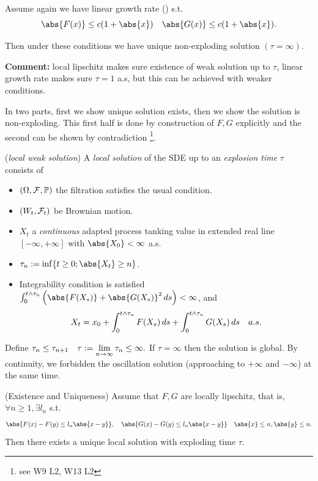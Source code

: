 Assume again we have linear growth rate () s.t.
\begin{equation*}
    \abs{F(x)} \leq c(1 + \abs{x}) \quad \abs{G(x)} \leq c(1 + \abs{x}).
\end{equation*}

Then under these conditions we have unique non-exploding solution $(\tau = \infty)$.

\textbf{Comment:} local lipschitz makes sure existence of weak solution up to $\tau$, linear growth rate makes sure $\tau = 1$ a.s, but this can be achieved with weaker conditions.

\pf In two parts, first we show unique solution exists, then we show the solution is non-exploding. This first half is done by construction of $F, G$ explicitly and the second can be shown by contradiction \footnote{see W9 L2, W13 L2}.

\begin{dfn}{(\textit{local weak solution})}
A \textit{local solution} of the SDE up to an \textit{explosion time} $\tau$ consists of
\begin{itemize}
    \item $(\Omega, \mathcal{F}, \mathbb{P})$ the filtration satisfies the usual condition.
    \item $(W_t, \mathcal{F}_t)$ be Brownian motion.
    \item $X_t$ a \textit{continuous} adapted process tanking value in extended real line $[-\infty, +\infty]$ with $\abs{X_0} < \infty$ a.s.
    \item $\tau_n := \inf\{t \geq 0; \abs{X_t} \geq n\}$.
    \item Integrability condition is satisfied $\int_0^{t\wedge \tau_n} \left(\abs{F(X_s)}+\abs{G(X_s)}^2 \diff s \right) <\infty$, and
\begin{equation*}
    X_t = x_0 + \int_0^{t\wedge \tau_n} F(X_s) \mathop{}\!d s + \int_0^{t\wedge \tau_n} G(X_s) \mathop{}\!d s\quad a.s.
\end{equation*}
\end{itemize}
\end{dfn}

\begin{rem}
Define $\tau_n \leq \tau_{n+1} \quad \tau := \lim\limits_{n\rightarrow \infty} \tau_n \leq \infty.$ If $\tau = \infty$ then the solution is global. By continuity, we forbidden the oscillation solution (approaching to $+\infty$ and $-\infty$) at the same time.
\end{rem}

\begin{thm}{(Existence and Uniqueness)}
Assume that $F, G$ are locally lipschitz, that is, $\forall n \geq 1, \exists l_n$ s.t.
\begin{equation*}
    \abs{F(x)- F(y) \leq l_n\abs{x-y}}, \quad \abs{G(x)- G(y) \leq l_n\abs{x-y}} \quad \abs{x} \leq n, \abs{y} \leq n.
\end{equation*}
Then there exists a unique local solution with exploding time $\tau$.
\end{thm}

